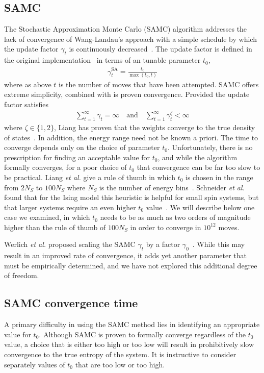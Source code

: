 \documentclass[letterpaper,twocolumn,amsmath,amssymb,pre,aps,10pt]{revtex4-1}
\begin{document}
\subsection{SAMC}
The Stochastic Approximation Monte Carlo (SAMC) algorithm addresses
the lack of convergence of Wang-Landau's approach with a simple
schedule by which the update factor $\gamma_t$ is continuously
decreased~\cite{liang2007stochastic, werlich2015stochastic,
  schneider2017convergence}.  The update factor is defined in the
original implementation~\cite{liang2007stochastic} in terms of an
tunable parameter $t_0$,
\begin{align}
\gamma_{t}^{\text{SA}} =\frac{t_0}{\max(t_0,t)}\label{eq:1}
\end{align}
where as above $t$ is the number of moves that have been attempted.
SAMC offers extreme simplicity, combined with is proven convergence.
Provided the update factor satisfies
\begin{align}
\sum_{t=1}^\infty \gamma_{t} = \infty \quad\textrm{and}\quad
\sum_{t=1}^\infty \gamma_{t}^\zeta < \infty
\end{align}
where $\zeta \in \{1,2\}$, Liang has proven that the weights converge to the
true density of states~\cite{liang2006theory,
  liang2007stochastic}.  In addition, the energy range need not be
known a priori.  The time to converge depends only on the choice of
parameter $t_0$.  Unfortunately, there is no prescription for finding
an acceptable value for $t_0$, and while the algorithm formally
converges, for a poor choice of $t_0$ that convergence can be far too
slow to be practical. Liang \emph{et al.} give a rule of thumb in
which $t_0$ is chosen in the range from $2N_S$ to $100N_S$ where $N_S$
is the number of energy bins~\cite{liang2007stochastic}.  Schneider
\emph{et al.} found that for the Ising model this heuristic is helpful
for small spin systems, but that larger systems require an even higher
$t_0$ value~\cite{schneider2017convergence}.  We will describe below
one case we examined, in which $t_0$ needs to be as much as two orders
of magnitude higher than the rule of thumb of $100N_S$ in order to
converge in $10^{12}$ moves.

Werlich \emph{et al.} proposed scaling the SAMC $\gamma_t$ by a factor
$\gamma_0$~\cite{werlich2015stochastic}.  While this may result in an
improved rate of convergence, it adds yet another parameter that must
be empirically determined, and we have not explored this additional degree of
freedom.

\subsection{SAMC convergence time}\label{sec:samc-convergence}
A primary difficulty in using the SAMC method lies in identifying an
appropriate value for $t_0$.  Although SAMC is proven to formally
converge regardless of the $t_0$ value, a choice that is either too
high or too low will result in prohibitively slow convergence to the true
entropy of the system.  It is instructive to consider separately
values of $t_0$ that are too low or too high.
\end{document}
